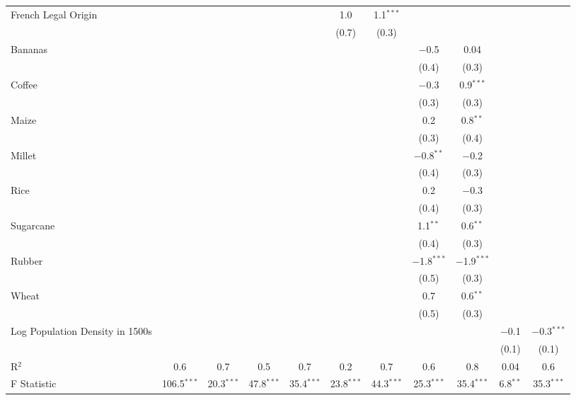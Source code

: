 \begin{table}[!htbp]
\begin{threeparttable}
\begin{tabular}{@{\extracolsep{0pt}}lcccccccccc}
  French Legal Origin &  &  &  &  & 1.0 & 1.1$^{***}$ &  &  &  &  \\ 
  &  &  &  &  & (0.7) & (0.3) &  &  &  &  \\ 
  Bananas &  &  &  &  &  &  & $-$0.5 & 0.04 &  &  \\ 
  &  &  &  &  &  &  & (0.4) & (0.3) &  &  \\ 
  Coffee &  &  &  &  &  &  & $-$0.3 & 0.9$^{***}$ &  &  \\ 
  &  &  &  &  &  &  & (0.3) & (0.3) &  &  \\ 
  Maize &  &  &  &  &  &  & 0.2 & 0.8$^{**}$ &  &  \\ 
  &  &  &  &  &  &  & (0.3) & (0.4) &  &  \\ 
  Millet &  &  &  &  &  &  & $-$0.8$^{**}$ & $-$0.2 &  &  \\ 
  &  &  &  &  &  &  & (0.4) & (0.3) &  &  \\ 
  Rice &  &  &  &  &  &  & 0.2 & $-$0.3 &  &  \\ 
  &  &  &  &  &  &  & (0.4) & (0.3) &  &  \\ 
  Sugarcane &  &  &  &  &  &  & 1.1$^{**}$ & 0.6$^{**}$ &  &  \\ 
  &  &  &  &  &  &  & (0.4) & (0.3) &  &  \\ 
  Rubber &  &  &  &  &  &  & $-$1.8$^{***}$ & $-$1.9$^{***}$ &  &  \\ 
  &  &  &  &  &  &  & (0.5) & (0.3) &  &  \\ 
  Wheat &  &  &  &  &  &  & 0.7 & 0.6$^{**}$ &  &  \\ 
  &  &  &  &  &  &  & (0.5) & (0.3) &  &  \\ 
  Log Population Density in 1500s &  &  &  &  &  &  &  &  & $-$0.1 & $-$0.3$^{***}$ \\ 
  &  &  &  &  &  &  &  &  & (0.1) & (0.1) \\ 
R$^{2}$ & 0.6 & 0.7 & 0.5 & 0.7 & 0.2 & 0.7 & 0.6 & 0.8 & 0.04 & 0.6 \\ 
F Statistic & 106.5$^{***}$  & 20.3$^{***}$  & 47.8$^{***}$  & 35.4$^{***}$  & 23.8$^{***}$  & 44.3$^{***}$ & 25.3$^{***}$  & 35.4$^{***}$  & 6.8$^{**}$  & 35.3$^{***}$\\ 


\end{tabular}
\end{threeparttable}
\end{table}
